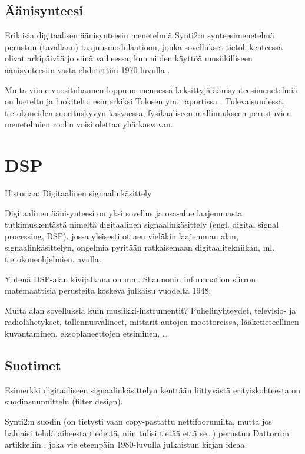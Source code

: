 \documentclass[pdf,10pt]{beamer}
\begin{document}
\subsection{Äänisynteesi}
\begin{frame}{Erilaisia digitaalisen äänisynteesin menetelmiä}
  Synti2:n synteesimenetelmä perustuu (tavallaan) taajuusmodulaatioon,
  jonka sovellukset tietoliikenteessä olivat arkipäivää jo siinä
  vaiheessa, kun niiden käyttöä musiikilliseen äänisynteesiin vasta
  ehdotettiin 1970-luvulla \cite{chowning1973fm}.

  Muita viime vuosituhannen loppuun mennessä keksittyjä
  äänisynteesimenetelmiä on lueteltu ja luokiteltu esimerkiksi Tolosen
  ym. raportissa \cite{TolonenEtal1998evaluation}. Tulevaisuudessa,
  tietokoneiden suorituskyvyn kasvaessa, fysikaaliseen mallinnukseen
  perustuvien menetelmien roolin voisi olettaa yhä kasvavan.

\end{frame}

\section{DSP}
\begin{frame}{Historiaa: Digitaalinen signaalinkäsittely}

  Digitaalinen äänisynteesi on yksi sovellus ja osa-alue
  laajemmasta tutkimuskentästä nimeltä digitaalinen signaalinkäsittely
  (engl. digital signal processing, DSP), jossa yleisesti ottaen
  vieläkin laajemman alan, signaalinkäsittelyn, ongelmia pyritään
  ratkaisemaan digitaalitekniikan, ml. tietokoneohjelmien, avulla.

  Yhtenä DSP-alan kivijalkana on mm. Shannonin informaation siirron
  matemaattisia perusteita koskeva julkaisu
  \cite{shannon48amathematical} vuodelta 1948.

  Muita alan sovelluksia kuin musiikki-instrumentit? Puhelinyhteydet,
  televisio- ja radiolähetykset, tallennusvälineet, mittarit autojen
  moottoreissa, lääketieteellinen kuvantaminen, eksoplaneettojen
  etsiminen, \ldots
  
\end{frame}

\subsection{Suotimet}
\begin{frame}

  Esimerkki digitaaliseen signaalinkäsittelyn kenttään liittyvästä
  erityiskohteesta on suodinsuunnittelu (filter design).

  Synti2:n suodin (on tietysti vaan copy-pastattu nettifoorumilta,
  mutta jos haluaisi tehdä aiheesta tiedettä, niin tulisi tietää että
  se\ldots) perustuu Dattorron artikkeliin \cite{dattorro1997effect},
  joka vie eteenpäin 1980-luvulla julkaistun kirjan
  \cite{Chamberlin1980} ideaa.

\end{frame}
\end{document}
